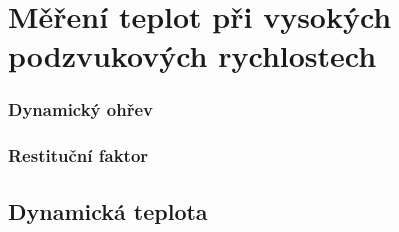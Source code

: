 \section{Měření teplot při vysokých podzvukových rychlostech}
    \subsubsection{Dynamický ohřev}
    \subsubsection{Restituční faktor}
    
    \subsection{Dynamická teplota}